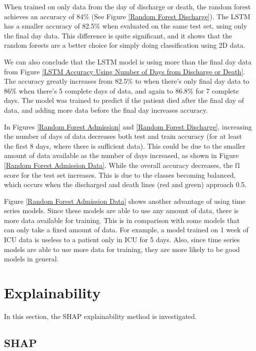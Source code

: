 \documentclass[12pt]{article}
\begin{document}
When trained on only data from the day of discharge or death, the random forest achieves an accuracy of 84\% (See Figure \ref{Random Forest Discharge}). The LSTM has a smaller accuracy of 82.5\% when evaluated on the same test set, using only the final day data. This difference is quite significant, and it shows that the random forests are a better choice for simply doing classification using 2D data.

We can also conclude that the LSTM model is using more than the final day data from Figure \ref{LSTM Accuracy Using Number of Days from Discharge or Death}. The accuracy greatly increases from 82.5\% to when there's only final day data to 86\% when there's 5 complete days of data, and again to 86.8\% for 7 complete days. The model was trained to predict if the patient died after the final day of data, and adding more data before the final day increases accuracy.

In Figures \ref{Random Forest Admission} and \ref{Random Forest Discharge}, increasing the number of days of data decreases both test and train accuracy (for at least the first 8 days, where there is sufficient data). This could be due to the smaller amount of data available as the number of days increased, as shown in Figure \ref{Random Forest Admission Data}. While the overall accuracy decreases, the f1 score for the test set increases. This is due to the classes becoming balanced, which occurs when the discharged and death lines (red and green) approach 0.5. 

Figure \ref{Random Forest Admission Data} shows another advantage of using time series models. Since these models are able to use any amount of data, there is more data available for training. This is in comparison with some models that can only take a fixed amount of data. For example, a model trained on 1 week of ICU data is useless to a patient only in ICU for 5 days. Also, since time series models are able to use more data for training, they are more likely to be good models in general. 

\section{Explainability}
In this section, the SHAP explainability method is investigated. 

\subsection{SHAP}
\end{document}
